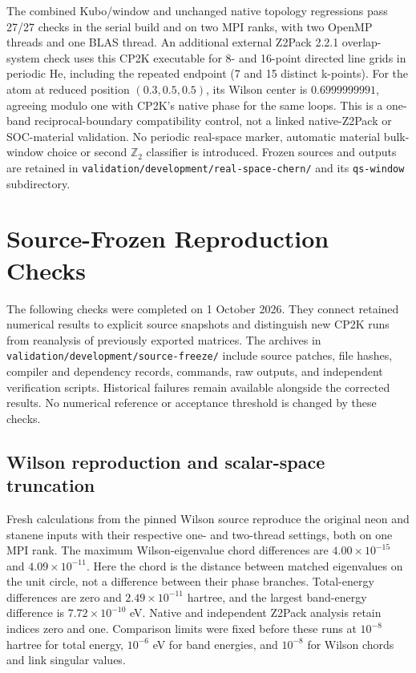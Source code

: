\documentclass[11pt]{article}
\begin{document}
The combined Kubo/window and unchanged native topology regressions
pass 27/27 checks in the serial build and on two MPI ranks, with
two OpenMP threads and one BLAS thread. An additional external
Z2Pack 2.2.1 overlap-system check uses this CP2K executable for
8- and 16-point directed line grids in periodic He, including the
repeated endpoint (7 and 15 distinct k-points). For the atom at
reduced position $(0.3,0.5,0.5)$, its Wilson center is
$0.6999999991$, agreeing modulo one with CP2K's native phase for
the same loops. This is a one-band reciprocal-boundary compatibility
control, not a linked native-Z2Pack or SOC-material validation.
No periodic real-space marker, automatic material bulk-window choice
or second $\mathbb Z_2$ classifier is introduced. Frozen sources and
outputs are retained in
\nolinkurl{validation/development/real-space-chern/} and its
\texttt{qs-window} subdirectory.

\clearpage
\section{Source-Frozen Reproduction Checks}
\label{sec:si-frozen-reproduction}

The following checks were completed on 1 October 2026. They connect
retained numerical results to explicit source snapshots and distinguish
new CP2K runs from reanalysis of previously exported matrices. The
archives in \nolinkurl{validation/development/source-freeze/} include
source patches, file hashes, compiler and dependency records, commands,
raw outputs, and independent verification scripts. Historical failures
remain available alongside the corrected results. No numerical reference
or acceptance threshold is changed by these checks.

\subsection{Wilson reproduction and scalar-space truncation}
Fresh calculations from the pinned Wilson source reproduce the original
neon and stanene inputs with their respective one- and two-thread
settings, both on one MPI rank. The maximum Wilson-eigenvalue chord
differences are $4.00\times10^{-15}$ and $4.09\times10^{-11}$.
Here the chord is the distance between matched eigenvalues on the unit
circle, not a difference between their phase branches.
Total-energy differences are zero and $2.49\times10^{-11}$ hartree,
and the largest band-energy difference is $7.72\times10^{-10}$ eV.
Native and independent Z2Pack analysis retain indices zero and one.
Comparison limits were fixed before these runs at $10^{-8}$ hartree
for total energy, $10^{-6}$ eV for band energies, and $10^{-8}$ for
Wilson chords and link singular values.
\end{document}
